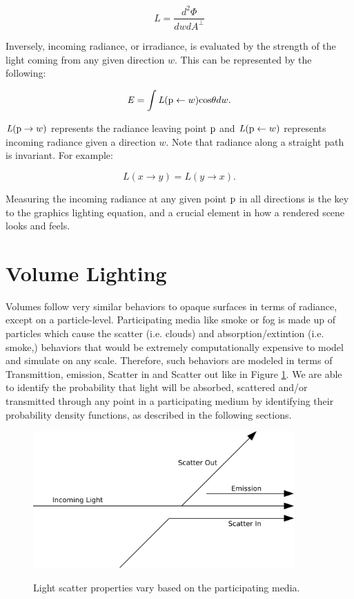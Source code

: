 \documentclass[12pt]{ucthesis}
\newcommand{\captionfonts}{\small\bf\ssp}
\begin{document}
\begin{equation}
\mathit{L} = \frac{\mathit{d^{2}\Phi}}{\mathit{dwdA}^\perp}
\label{eq:radiance}
\end{equation}

Inversely, incoming radiance, or irradiance, is evaluated by the strength of the light coming from any given direction $w$.  This  can be represented by the following:

\begin{equation}
\mathit{E} = \int\mathit{L}(\textup{p} \leftarrow w)\textup{cos}\theta dw.
\label{irradiance}
\end{equation}

$\mathit{L}(\textup{p} \to w)$ represents the radiance leaving point $\textup{p}$ and $\mathit{L}(\textup{p} \leftarrow w)$ represents incoming radiance given a direction $w$.  Note that radiance along a straight path is invariant.  For example:

\begin{equation}
L(x \to y) = L(y \to x).
\label{eq:invariance}
\end{equation}

Measuring the incoming radiance at any given point $\textup{p}$ in all directions is the key to the graphics lighting equation, and a crucial element in how a rendered scene looks and feels.

\section{Volume Lighting}

Volumes follow very similar behaviors to opaque surfaces in terms of radiance, except on a particle-level.  Participating media like smoke or fog is made up of particles which cause the scatter (i.e. clouds) and absorption/extintion (i.e. smoke,) behaviors that would be extremely computationally expensive to model and simulate on any scale.  Therefore, such behaviors are modeled in terms of Transmittion, emission, Scatter in and Scatter out like in Figure \ref{fig:vol_scat}.  We are able to identify the probability that light will be absorbed, scattered and/or transmitted through any point in a participating medium by identifying their probability density functions, as described in the following sections. 
\begin{figure}[h!]
    \centering
    \includegraphics[width=100mm]{img/diag/vol_scatter.pdf}
    \captionfonts
    \caption{Light scatter properties vary based on the participating media.}
    \label{fig:vol_scat}
\end{figure}
\end{document}
